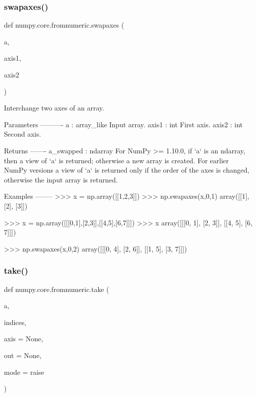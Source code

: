 \subsubsection{\texorpdfstring{swapaxes()}{swapaxes()}}
{\footnotesize\ttfamily def numpy.\+core.\+fromnumeric.\+swapaxes (\begin{DoxyParamCaption}\item[{}]{a,  }\item[{}]{axis1,  }\item[{}]{axis2 }\end{DoxyParamCaption})}

\begin{DoxyVerb}Interchange two axes of an array.

Parameters
----------
a : array_like
    Input array.
axis1 : int
    First axis.
axis2 : int
    Second axis.

Returns
-------
a_swapped : ndarray
    For NumPy >= 1.10.0, if `a` is an ndarray, then a view of `a` is
    returned; otherwise a new array is created. For earlier NumPy
    versions a view of `a` is returned only if the order of the
    axes is changed, otherwise the input array is returned.

Examples
--------
>>> x = np.array([[1,2,3]])
>>> np.swapaxes(x,0,1)
array([[1],
       [2],
       [3]])

>>> x = np.array([[[0,1],[2,3]],[[4,5],[6,7]]])
>>> x
array([[[0, 1],
        [2, 3]],
       [[4, 5],
        [6, 7]]])

>>> np.swapaxes(x,0,2)
array([[[0, 4],
        [2, 6]],
       [[1, 5],
        [3, 7]]])\end{DoxyVerb}
 \mbox{\label{namespacenumpy_1_1core_1_1fromnumeric_a9ce1152680e42f10b320cc3bce091e82}} 
\subsubsection{\texorpdfstring{take()}{take()}}
{\footnotesize\ttfamily def numpy.\+core.\+fromnumeric.\+take (\begin{DoxyParamCaption}\item[{}]{a,  }\item[{}]{indices,  }\item[{}]{axis = {\ttfamily None},  }\item[{}]{out = {\ttfamily None},  }\item[{}]{mode = {\ttfamily \textquotesingle{}raise\textquotesingle{}} }\end{DoxyParamCaption})}

